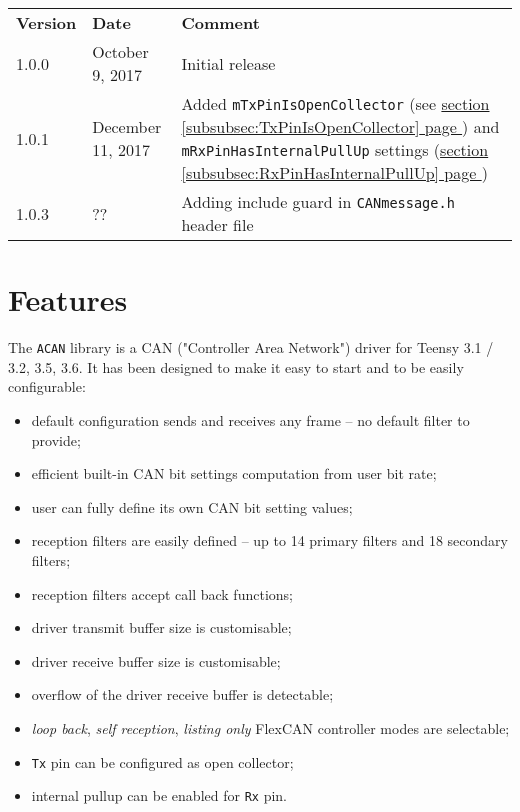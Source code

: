 \documentclass[10pt, a4paper, obeyspaces, openany]{extarticle}
\newcommand\refSubsubsectionPage[1]{\hyperref[subsubsec:#1]{section \ref*{subsubsec:#1} page \pageref{subsubsec:#1}}}
\begin{document}
\begin{center}
  \begin{tabular}{llp{10cm}}
    \textbf{Version} & \textbf{Date} & \textbf{Comment}\\
    1.0.0 & October 9, 2017 & Initial release \\
    1.0.1 & December 11, 2017 & Added \texttt{mTxPinIsOpenCollector} (see \refSubsubsectionPage{TxPinIsOpenCollector}) and \texttt{mRxPinHasInternalPullUp} settings (\refSubsubsectionPage{RxPinHasInternalPullUp}) \\
    1.0.3 & ?? & Adding include guard in \texttt{CANmessage.h} header file
  \end{tabular}
\end{center}

\section{Features}

The \texttt{ACAN} library is a CAN ("Controller Area Network") driver for Teensy 3.1 / 3.2, 3.5, 3.6. It has been designed to make it easy to start and to be easily configurable:
\begin{itemize}
  \item default configuration sends and receives any frame -- no default filter to provide;
  \item efficient built-in CAN bit settings computation from user bit rate;
  \item user can fully define its own CAN bit setting values;
  \item reception filters are easily defined -- up to 14 primary filters and 18 secondary filters;
  \item reception filters accept call back functions;
  \item driver transmit buffer size is customisable;
  \item driver receive buffer size is customisable;
  \item overflow of the driver receive buffer is detectable;
  \item \emph{loop back}, \emph{self reception}, \emph{listing only} FlexCAN controller modes are selectable;
  \item \texttt{Tx} pin can be configured as open collector;
  \item internal pullup can be enabled for \texttt{Rx} pin.
\end{itemize}
\end{document}
